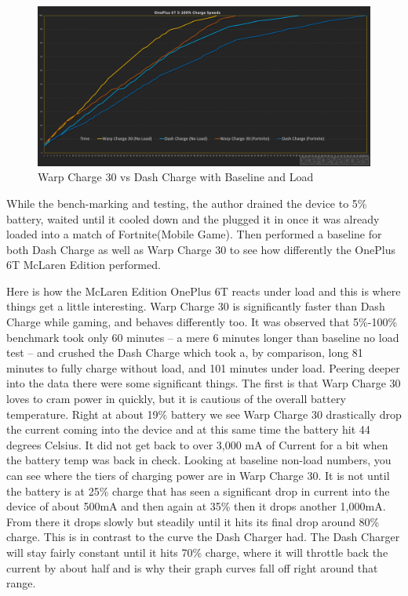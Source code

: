 \documentclass[conference]{IEEEtran}
\begin{document}
\begin{figure}[h!]
  \includegraphics[width=\linewidth]{images/image15.png}
  \caption{ Warp Charge 30 vs Dash Charge with Baseline and Load\cite{b18}}
\end{figure}

While the bench-marking and testing, the author\cite{b17} drained the device to 5\% battery, waited until it cooled down and the plugged it in once it was already loaded into a match of Fortnite(Mobile Game). Then performed a baseline for both Dash Charge as well as Warp Charge 30 to see how differently the OnePlus 6T McLaren Edition performed\cite{b18}. 

Here is how the McLaren Edition OnePlus 6T reacts under load and this is where things get a little interesting. Warp Charge 30 is significantly faster than Dash Charge while gaming, and behaves differently too. It was observed that 5\%-100\% benchmark took only 60 minutes – a mere 6 minutes longer than baseline no load test – and crushed the Dash Charge which took a, by comparison, long 81 minutes to fully charge without load, and 101 minutes under load. Peering deeper into the data there were some significant things. The first is that Warp Charge 30 loves to cram power in quickly, but it is cautious of the overall battery temperature. Right at about 19\% battery we see Warp Charge 30 drastically drop the current coming into the device and at this same time the battery hit 44 degrees Celsius. It did not get back to over 3,000 mA of Current for a bit when the battery temp was back in check. Looking at baseline non-load numbers, you can see where the tiers of charging power are in Warp Charge 30. It is not until the battery is at 25\% charge that has seen a significant drop in current into the device of about 500mA and then again at 35\%  then it drops another 1,000mA. From there it drops slowly but steadily until it hits its final drop around 80\% charge. This is in contrast to the curve the Dash Charger had. The Dash Charger will stay fairly constant until it hits 70\% charge, where it will throttle back the current by about half and is why their graph curves fall off right around that range\cite{b18}. 
\end{document}
